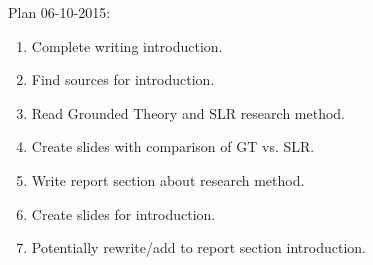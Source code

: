 Plan 06-10-2015:
\begin{enumerate}
	\item Complete writing introduction.
	\item Find sources for introduction.
	
	\item Read Grounded Theory and SLR research method.
	\item Create slides with comparison of GT vs. SLR.
	
	\item Write report section about research method.
	
	\item Create slides for introduction.
	\item Potentially rewrite/add to report section introduction.
\end{enumerate}
